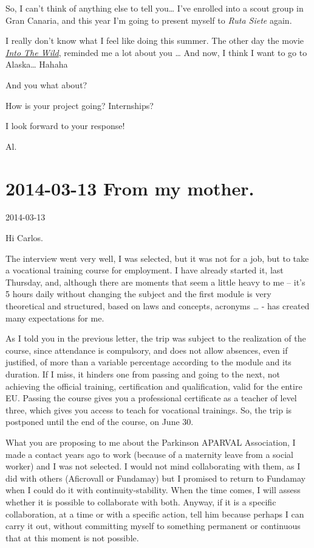 \documentclass[]{book}
\begin{document}
So, I can't think of anything else to tell you\ldots{} I've enrolled into a scout group in Gran Canaria, and this year I'm going to present myself to \emph{Ruta Siete} again.

I really don't know what I feel like doing this summer. The other day the movie \href{https://en.wikipedia.org/wiki/Into_the_Wild_(film)}{\emph{Into The Wild}}, reminded me a lot about you \ldots{} And now, I think I want to go to Alaska\ldots{} Hahaha

And you what about?

How is your project going? Internships?

I look forward to your response!

Al.

\hypertarget{frommother20140313}{%
\section*{2014-03-13 From my mother.}\label{frommother20140313}}

2014-03-13

Hi Carlos.

The interview went very well, I was selected, but it was not for a job, but to take a vocational training course for employment. I have already started it, last Thursday, and, although there are moments that seem a little heavy to me -- it's 5 hours daily without changing the subject and the first module is very theoretical and structured, based on laws and concepts, acronyms \ldots{} - has created many expectations for me.

As I told you in the previous letter, the trip was subject to the realization of the course, since attendance is compulsory, and does not allow absences, even if justified, of more than a variable percentage according to the module and its duration. If I miss, it hinders one from passing and going to the next, not achieving the official training, certification and qualification, valid for the entire EU. Passing the course gives you a professional certificate as a teacher of level three, which gives you access to teach for vocational trainings. So, the trip is postponed until the end of the course, on June 30.

What you are proposing to me about the Parkinson APARVAL Association, I made a contact years ago to work (because of a maternity leave from a social worker) and I was not selected. I would not mind collaborating with them, as I did with others (Aficrovall or Fundamay) but I promised to return to Fundamay when I could do it with continuity-stability. When the time comes, I will assess whether it is possible to collaborate with both. Anyway, if it is a specific collaboration, at a time or with a specific action, tell him because perhaps I can carry it out, without committing myself to something permanent or continuous that at this moment is not possible.
\end{document}

